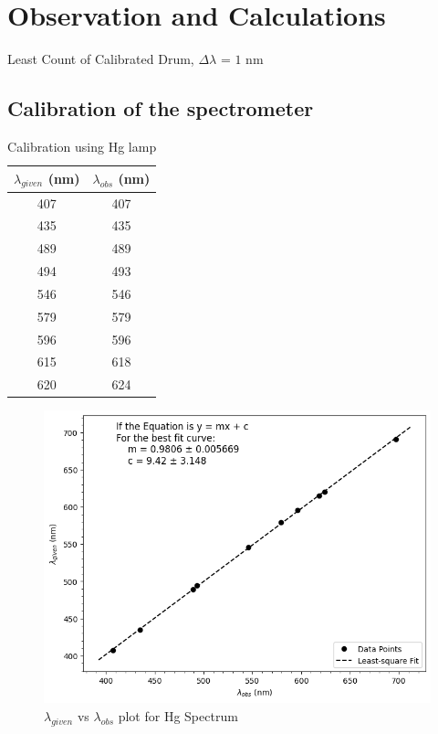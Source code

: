 \section{Observation and Calculations}
Least Count of Calibrated Drum, $\Delta \lambda$ = $1$ nm

\subsection*{Calibration of the spectrometer}

\begin{table}[H]
    \centering
    \begin{tabular}{|c|c|}
    \hline
    $\lambda_{given}$ (nm) & $\lambda_{obs}$ (nm) \\ \hline
    407 & 407 \\ \hline
    435 & 435 \\ \hline
    489 & 489 \\ \hline
    494 & 493 \\ \hline
    546 & 546 \\ \hline
    579 & 579 \\ \hline
    596 & 596 \\ \hline
    615 & 618 \\ \hline
    620 & 624 \\ \hline
    \end{tabular}%
    \caption{Calibration using Hg lamp}
    \label{tab:calib}
\end{table}

\begin{figure}[H]
    \includegraphics[width=\columnwidth]{images/plt.png}
    \caption{$\lambda_{given}$ vs $\lambda_{obs}$ plot for Hg Spectrum}
    \label{fig:t1}
\end{figure}

